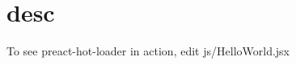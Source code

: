 \chapter{desc}
\hypertarget{md__d_1_2_g_i_t_2_food_link_2foodlink_8client_2node__modules_2bs-recipes_2recipes_2webpack_8preact-hot-loader_2desc}{}\label{md__d_1_2_g_i_t_2_food_link_2foodlink_8client_2node__modules_2bs-recipes_2recipes_2webpack_8preact-hot-loader_2desc}
To see {\ttfamily preact-\/hot-\/loader} in action, edit {\ttfamily js/\+Hello\+World.\+jsx} 